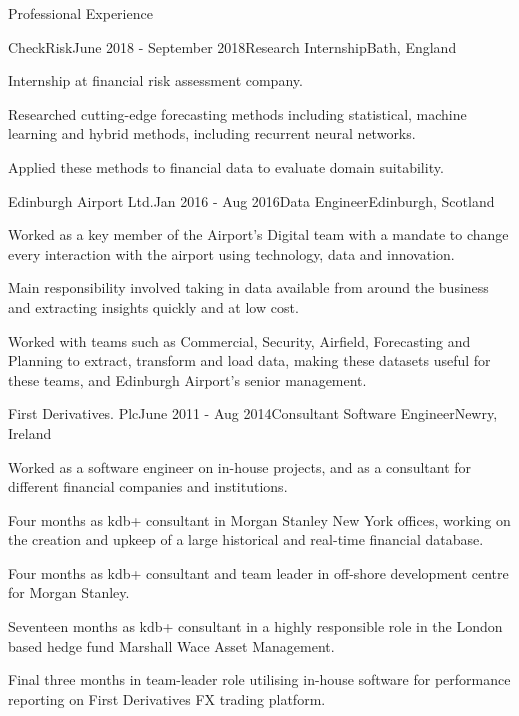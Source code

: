 \documentclass{resume} %
\begin{document}
\begin{rSection}{Professional Experience}
  \begin{rSubsection}{CheckRisk}{June 2018 - September 2018}{Research Internship}{Bath, England}
    \item Internship at financial risk assessment company. 
    \item Researched cutting-edge forecasting methods including statistical, machine learning and hybrid methods, including recurrent neural networks. 
    \item Applied these methods to financial data to evaluate domain suitability.
  \end{rSubsection}

  \begin{rSubsection}{Edinburgh Airport Ltd.}{Jan 2016 - Aug 2016}{Data Engineer}{Edinburgh, Scotland}
    \item Worked as a key member of the Airport's Digital team with a mandate to change every interaction with the airport using technology, data and innovation.
    \item Main responsibility involved taking in data available from around the business and extracting insights quickly and at low cost.
    \item Worked with teams such as Commercial, Security, Airfield, Forecasting and Planning to extract, transform and load data, making these datasets useful for these teams, and Edinburgh Airport’s senior management.
  \end{rSubsection}

  \begin{rSubsection}{First Derivatives. Plc}{June 2011 - Aug 2014}{Consultant Software Engineer}{Newry, Ireland}
    \item Worked as a software engineer on in-house projects, and as a consultant for different financial companies and institutions.
    \item Four months as kdb+ consultant in Morgan Stanley New York offices, working on the creation and upkeep of a large historical and real-time financial database.
    \item Four months as kdb+ consultant and team leader in off-shore development centre for Morgan Stanley.
    \item Seventeen months as kdb+ consultant in a highly responsible role in the London based hedge fund Marshall Wace Asset Management.
    \item Final three months in team-leader role utilising in-house software for performance reporting on First Derivatives FX trading platform.
  \end{rSubsection}


\end{rSection}
\end{document}
